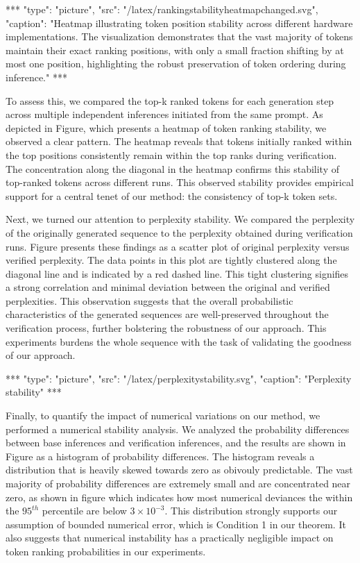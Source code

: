 \documentclass{article}
\begin{document}
\begin{center}
***
"type": "picture",
"src": "/latex/rankingstabilityheatmapchanged.svg",
"caption": "Heatmap illustrating token position stability across different hardware implementations. The visualization demonstrates that the vast majority of tokens maintain their exact ranking positions, with only a small fraction shifting by at most one position, highlighting the robust preservation of token ordering during inference."
***
\end{center}

To assess this, we compared the top-k ranked tokens for each generation step across multiple independent inferences initiated from the same prompt. As depicted in Figure, which presents a heatmap of token ranking stability, we observed a clear pattern. The heatmap reveals that tokens initially ranked within the top positions consistently remain within the top ranks during verification.  The concentration along the diagonal in the heatmap confirms this stability of top-ranked tokens across different runs. This observed stability provides empirical support for a central tenet of our method: the consistency of top-k token sets.

Next, we turned our attention to perplexity stability. We compared the perplexity of the originally generated sequence to the perplexity obtained during verification runs. Figure presents these findings as a scatter plot of original perplexity versus verified perplexity. The data points in this plot are tightly clustered along the diagonal line and is indicated by a red dashed line. This tight clustering signifies a strong correlation and minimal deviation between the original and verified perplexities. This observation suggests that the overall probabilistic characteristics of the generated sequences are well-preserved throughout the verification process, further bolstering the robustness of our approach.  This experiments burdens the whole sequence with the task of validating the goodness of our approach.

\begin{center}
***
"type": "picture",
"src": "/latex/perplexitystability.svg",
"caption": "Perplexity stability"
***
\end{center}

Finally, to quantify the impact of numerical variations on our method, we performed a numerical stability analysis.  We analyzed the probability differences between base inferences and verification inferences, and the results are shown in Figure as a histogram of probability differences. The histogram reveals a distribution that is heavily skewed towards zero as obivouly predictable. The vast majority of probability differences are extremely small and are concentrated near zero, as shown in figure which indicates how most numerical deviances the within the $95^{th}$ percentile are below $3 \times 10^{-3}$. This distribution strongly supports our assumption of bounded numerical error, which is Condition 1 in our theorem. It also suggests that numerical instability has a practically negligible impact on token ranking probabilities in our experiments.
\end{document}
